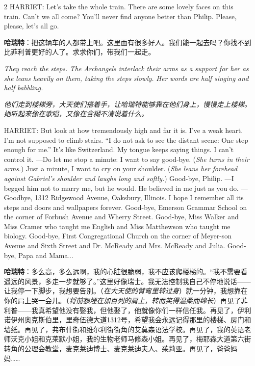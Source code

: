 \documentclass[lang=cn,newtx,10pt,scheme=chinese]{elegantbook}
\newcommand{\pair}[2]{%
\switchcolumn* #2\par
\switchcolumn  #1\par
}
\begin{document}
\begin{paracol}{2}
\pair{
    \textbf{哈瑞特}：把这辆车的人都带上吧。这里面有很多好人。我们能一起去吗？你找不到比菲利普更好的人了。求求你们，带我们一起走。
}{
    HARRIET: Let's take the whole train. There are some lovely faces on this train. Can't we all come? You'll never find anyone better than Philip. Please, please, let's all go.
    \newline
    \newline
}

\pair{
    \textit{他们走到楼梯旁，大天使们搭着手，让哈瑞特能够靠在他们身上，慢慢走上楼梯。她听起来像在歌唱，又像在含糊不清说着什么。}
}{
    \textit{They reach the steps. The Archangels interlock their arms as a support for her as she leans heavily on them, taking the steps slowly. Her words are half singing and half babbling.}
    \newline
    \newline
}

\pair{
    \textbf{哈瑞特}：多么高，多么远啊，我的心脏很脆弱，我不应该爬楼梯的。“我不需要看遥远的风景，多走一步就够了。”这里好像瑞士。我无法控制我自己不停地说话——让我停一下脚步，我想要告别。（\textit{在大天使的臂弯里转过身}）就一分钟，我想靠在你的肩上哭一会儿。（\textit{将前额埋在加百列的肩上，转而笑得温柔而绵长}）再见了菲利普——我真希望他没有娶我，但他娶了，他就像你们一样信任我。再见了，伊利诺伊州奥克斯伯里，里奇伍德大道1312号，希望我会永远记得那里的楼梯、房门和墙纸。再见了，弗布什街和维尔利街街角的艾莫森语法学校。再见了，我的英语老师沃克小姐和克莱默小姐，我的生物老师马修森小姐。再见了，梅耶森大道第六街转角的公理会教堂，麦克莱迪博士、麦克莱迪夫人、茱莉亚。再见了，爸爸妈妈……
}{
    HARRIET: But look at how tremendously high and far it is. I've a weak heart. I'm not supposed to climb stairs. “I do not ask to see the distant scene: One step enough for me.” It's like Switzerland. My tongue keeps saying things. I can't control it. —Do let me stop a minute: I want to say good-bye. (\textit{She turns in their arms.}) Just a minute, I want to cry on your shoulder. (\textit{She leans her forehead against Gabriel's shoulder and laughs long and softly.}) Good-bye, Philip. —I begged him not to marry me, but he would. He believed in me just as you do. —Goodbye, 1312 Ridgewood Avenue, Oaksbury, Illinois. I hope I remember all its steps and doors and wallpapers forever. Good-bye, Emerson Grammar School on the corner of Forbush Avenue and Wherry Street. Good-bye, Miss Walker and Miss Cramer who taught me English and Miss Matthewson who taught me biology. Good-bye, First Congregational Church on the corner of Meyer-son Avenue and Sixth Street and Dr. McReady and Mrs. McReady and Julia. Good-bye, Papa and Mama...
    \newline
}


\end{paracol}
\end{document}
